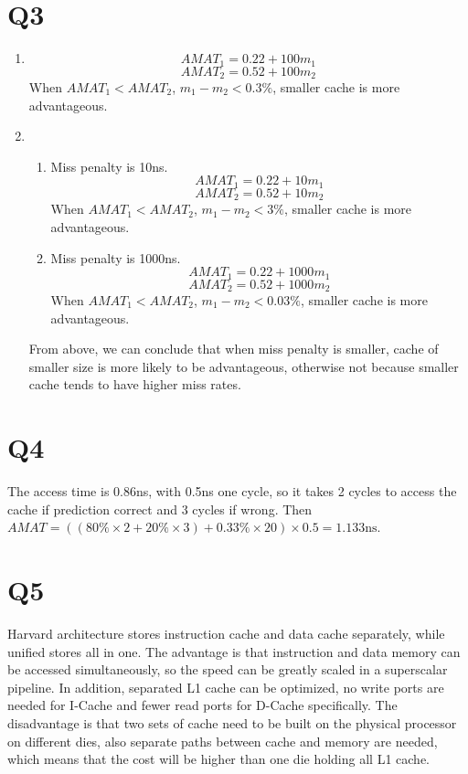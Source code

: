 \documentclass[12pt]{article}
\begin{document}
\section*{Q3}

	\begin{enumerate}
		\item
			$$AMAT_1=0.22+100m_1$$
			$$AMAT_2=0.52+100m_2$$
			When $AMAT_1<AMAT_2$, $m_1-m_2<0.3\%$, smaller cache is more advantageous.
		\item
			\begin{enumerate}
				\item
					Miss penalty is 10ns.
					$$AMAT_1=0.22+10m_1$$
					$$AMAT_2=0.52+10m_2$$
					When $AMAT_1<AMAT_2$, $m_1-m_2<3\%$, smaller cache is more advantageous.
				\item
					Miss penalty is 1000ns.
					$$AMAT_1=0.22+1000m_1$$
					$$AMAT_2=0.52+1000m_2$$
					When $AMAT_1<AMAT_2$, $m_1-m_2<0.03\%$, smaller cache is more advantageous.
			\end{enumerate}
			From above, we can conclude that when miss penalty is smaller, cache of smaller size is more likely to be advantageous, otherwise not because smaller cache tends to have higher miss rates.
	\end{enumerate}

\section*{Q4}

	The access time is 0.86ns, with 0.5ns one cycle, so it takes 2 cycles to access the cache if prediction correct and 3 cycles if wrong. Then $AMAT=((80\%\times2+20\%\times3)+0.33\%\times20)\times0.5=1.133\text{ns}$.

\section*{Q5}

	Harvard architecture stores instruction cache and data cache separately, while unified stores all in one. The advantage is that instruction and data memory can be accessed simultaneously, so the speed can be greatly scaled in a superscalar pipeline. In addition, separated L1 cache can be optimized, no write ports are needed for I-Cache and fewer read ports for D-Cache specifically. The disadvantage is that two sets of cache need to be built on the physical processor on different dies, also separate paths between cache and memory are needed, which means that the cost will be higher than one die holding all L1 cache.
\end{document}
